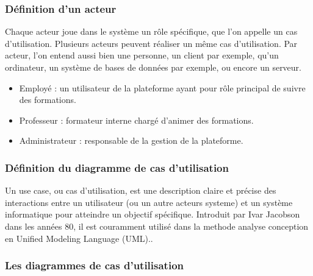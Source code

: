 \documentclass{article}
\begin{document}
\subsubsection{Définition d'un acteur}
\hspace*{2em}Chaque acteur joue dans le système un rôle spécifique, que l'on appelle un cas d'utilisation. Plusieurs acteurs peuvent réaliser un même cas d'utilisation. Par acteur, l'on entend aussi bien une personne, un client par exemple, qu'un ordinateur, un système de bases de données par exemple, ou encore un serveur.\cite{Acteur}

\begin{itemize}


\item Employé : un utilisateur de la plateforme ayant pour rôle principal de suivre des formations.

\item Professeur : formateur interne chargé d’animer des formations.

\item Administrateur : responsable de la gestion de la plateforme.
\end{itemize}
\subsubsection{Définition du diagramme de cas d’utilisation}


\hspace*{2em}Un use case, ou cas d'utilisation, est une description claire et précise des interactions entre un utilisateur (ou un autre acteurs systeme) et un système informatique pour atteindre un objectif spécifique. Introduit par Ivar Jacobson dans les années 80, il est couramment utilisé dans la methode analyse conception en Unified Modeling Language (UML)..\cite{Usecase}

\subsubsection{Les diagrammes de cas d'utilisation}
\end{document}
